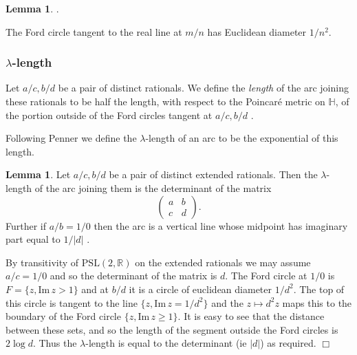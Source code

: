 \documentclass[12pt]{amsart}
\theoremstyle{plain}
\theoremstyle{definition}
\newtheorem{lem}[thm]{Lemma}
\def\HH{\mathbb{H}}
\def\im{\mathrm{Im}\,}
\def\ZZ{\mathbb{Z}}
\def\RR{\mathbb{R}}
\def\sl2{\mathrm{PSL}(2, \ZZ)}
\def\slr{\mathrm{PSL}(2, \RR)}
\begin{document}
\begin{lem}\label{ford}.

The Ford circle tangent to the real line at $m/n$
has Euclidean diameter $1/n^2$.
\end{lem}





\subsubsection{$\lambda$-length}

Let $a/c, b/d$ be a pair of distinct rationals.
We define the \textit{length} of the arc 
joining these rationals 
to be half the length, with respect to the Poincaré metric on $\HH$, 
of the portion  outside of the Ford circles tangent at $a/c, b/d$ .


Following Penner \cite{bob} we define the
$\lambda$-length of an arc to be the exponential of this 
length.

\begin{lem}\label{calcul}
Let $a/c, b/d$ be a pair of distinct extended rationals.
Then the  $\lambda$-length of the arc joining them
 is the determinant of the matrix
$$\begin{pmatrix}
a & b \\ c & d
\end{pmatrix}.$$
Further if $a/b = 1/0$ then the arc is a vertical line 
 whose midpoint has imaginary part equal to $1/|d|$ .
\end{lem}


\proof 
By transitivity of $\slr$ on the extended rationals we may assume 
$a/c = 1/0$ and so the determinant of the matrix is $d$.
The Ford circle at $1/0$  is $F= \{ z, \im z > 1\}$ and
at $b/d$ it is a circle of euclidean diameter $1/d^2$.
The top of this circle is tangent to the line $\{ z, \im z = 1/d^2\}$
and the $z \mapsto d^2 z $ maps this to the boundary 
of the Ford circle $\{ z, \im z \geq 1\}$.
It is easy to see that the distance between these sets,
and so the length of the segment outside the Ford circles
is $2\log d$. Thus the $\lambda$-length is equal to the 
determinant (ie $|d|$) as required.
\hfill $\Box$
\end{document}
